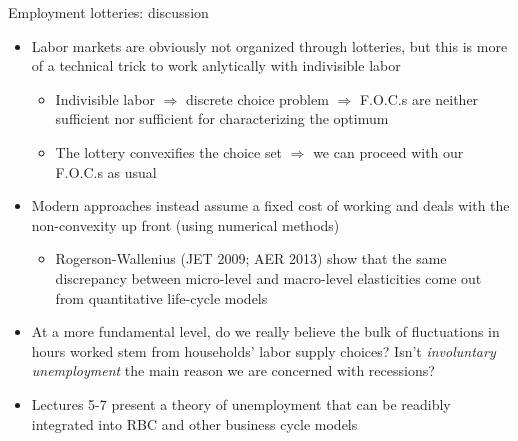 \documentclass[9pt,xcolor={dvipsnames}]{beamer}
\newcommand{\bit}{\begin{itemize}}
\newcommand{\eit}{\end{itemize}}
\begin{document}
\begin{frame}{Employment lotteries: discussion}

\bit
\setlength\itemsep{1.5em}

\item Labor markets are obviously not organized through lotteries, but this is more of a technical trick to work anlytically with indivisible labor
\bit
\setlength\itemsep{0.5em}
	\item Indivisible labor $\Rightarrow$ discrete choice problem $\Rightarrow$ F.O.C.s are neither sufficient nor sufficient for characterizing the optimum
	
	\item The lottery convexifies the choice set $\Rightarrow$ we can proceed with our F.O.C.s as usual
\eit

\item Modern approaches instead assume a fixed cost of working and deals with the non-convexity up front (using numerical methods)
\bit
\setlength\itemsep{0.5em}
	\item Rogerson-Wallenius (JET 2009; AER 2013) show that the same discrepancy between micro-level and macro-level elasticities come out from quantitative life-cycle models 
\eit

\item At a more fundamental level, do we really believe the bulk of fluctuations in hours worked stem from households' labor supply choices? Isn't \emph{involuntary unemployment} the main reason we are concerned with recessions? 

\item Lectures 5-7 present a theory of unemployment that can be readibly integrated into RBC and other business cycle models 
\eit

\end{frame}
\end{document}
